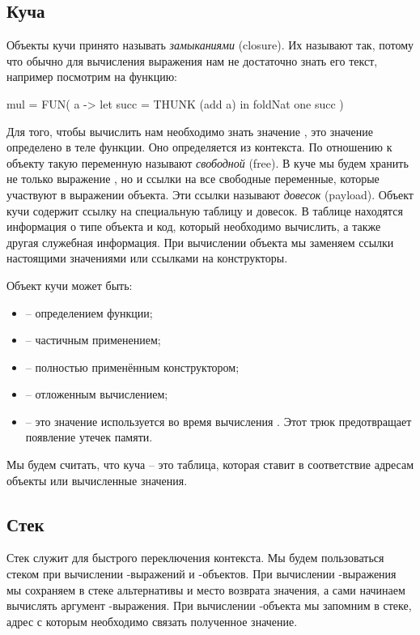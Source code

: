 \subsection{Куча}

Объекты кучи принято называть \emph{замыканиями} (closure). Их называют
так, потому что обычно для вычисления выражения нам не достаточно знать
его текст, например посмотрим на функцию:


\begin{code}
mul     = FUN( a -> 
            let succ = THUNK (add a)
            in  foldNat one succ
          )
\end{code}

Для того, чтобы вычислить  нам необходимо знать
значение , это значение определено в теле функции. Оно
определяется из контекста. По отношению к объекту такую переменную
называют \emph{свободной} (free). В куче мы будем хранить не только
выражение , но и ссылки на все свободные переменные, которые
участвуют в выражении объекта. Эти ссылки называют \emph{довесок}
(payload). Объект кучи содержит ссылку на специальную таблицу и довесок.
В таблице находятся информация о типе объекта и код, который необходимо
вычислить, а также другая служебная информация. При вычислении объекта
мы заменяем ссылки настоящими значениями или ссылками на конструкторы.

Объект кучи может быть:

\begin{itemize}
\item
   -- определением функции;
\item
   -- частичным применением;
\item
   -- полностью применённым конструктором;
\item
   -- отложенным вычислением;
\item
   -- это значение используется во время вычисления
  . Этот трюк предотвращает появление утечек памяти.
\end{itemize}

Мы будем считать, что куча -- это таблица, которая ставит в соответствие
адресам объекты или вычисленные значения.

\subsection{Стек}

Стек служит для быстрого переключения контекста. Мы будем пользоваться
стеком при вычислении -выражений и -объектов. При
вычислении -выражения мы сохраняем в стеке альтернативы и место
возврата значения, а сами начинаем вычислять аргумент
-выражения. При вычислении -объекта мы запомним в
стеке, адрес с которым необходимо связать полученное значение.

